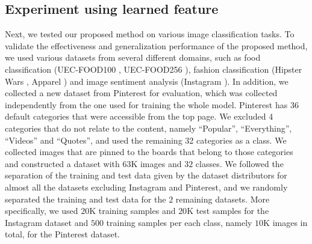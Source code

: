\documentclass[letterpaper]{article} %
\begin{document}
\subsection{Experiment using learned feature}
\label{sec:exp:pred}
\indent

Next, we tested our proposed method on various image classification tasks.
%
To validate the effectiveness and generalization performance of the proposed method, we used various datasets from several different domains, such as food classification (UEC-FOOD100 \cite{Matsuda2012}, UEC-FOOD256 \cite{Kawano2014c}), fashion classification (Hipster Wars \cite{Kiapour2014}, Apparel \cite{Bossard2012}) and image sentiment analysis (Instagram \cite{Katsurai2016}).
%
In addition, we collected a new dataset from Pinterest for evaluation, which was collected independently from the one used for training the whole model.
%
Pinterest has 36 default categories that were accessible from the top page.
%
We excluded 4 categories that do not relate to the content, namely ``Popular'', ``Everything'', ``Videos'' and ``Quotes'', and used the remaining 32 categories as a class.
%
We collected images that are pinned to the boards that belong to those categories and constructed a dataset with $63$K images and $32$ classes.
%
We followed the separation of the training and test data given by the dataset distributors for almost all the datasets excluding Instagram and Pinterest, and we randomly separated the training and test data for the $2$ remaining datasets.
%
More specifically, we used $20$K training samples and $20$K test samples for the Instagram dataset and $500$ training samples per each class, namely $10$K images in total, for the Pinterest dataset.
\end{document}
